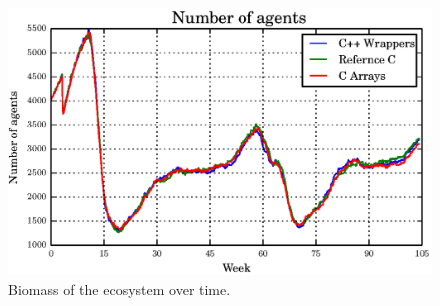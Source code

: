 \documentclass[12pt, a4paper]{report}
\begin{document}
\begin{appendices}
\begin{figure}[H]
  \begin{center}
    \includegraphics[width=\columnwidth]{graphs/ag-fixed-multi-double-comp.eps}
    \caption{Biomass of the ecosystem over time.}
    \label{fig:master-bio}
  \end{center}
\end{figure}

\end{appendices}
\end{document}
